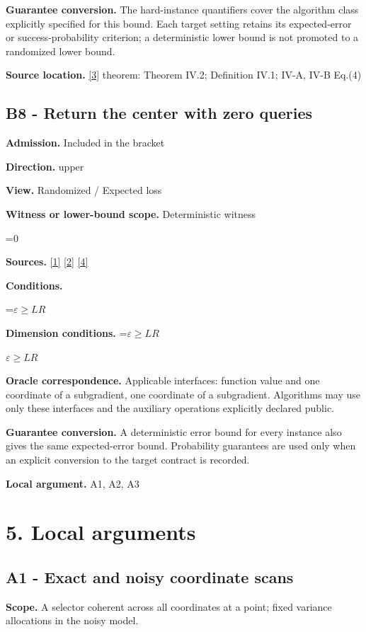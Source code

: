 \documentclass[10pt,a4paper]{article}
\newcommand{\AtlasMath}[1]{\par\begingroup\centering\setbox0=\hbox{$\displaystyle #1$}\ifdim\wd0>1.4\linewidth\typeout{ATLAS WIDE FORMULA: \the\wd0}\fi\ifdim\wd0>\linewidth\resizebox{\linewidth}{!}{\box0}\else\box0\fi\par\endgroup}
\newcommand{\AtlasInlineMath}[1]{\begingroup\setbox0=\hbox{$#1$}\ifdim\wd0>.4\linewidth\endgroup\AtlasMath{#1}\else\endgroup$#1$\fi}
\begin{document}
\textbf{Guarantee conversion.} The hard-instance quantifiers cover the algorithm class explicitly specified for this bound. Each target setting retains its expected-error or success-probability criterion; a deterministic lower bound is not promoted to a randomized lower bound.

\textbf{Source location.} \href{https://arxiv.org/pdf/1407.5144}{[3]} theorem: Theorem IV.2; Definition IV.1; IV-A, IV-B Eq.(4)

\subsection{B8 - Return the center with zero queries}
\textbf{Admission.} Included in the bracket

\textbf{Direction.} upper

\textbf{View.} Randomized / Expected loss

\textbf{Witness or lower-bound scope.} Deterministic witness

\AtlasMath{0}
\textbf{Sources.} \href{https://arxiv.org/pdf/1405.4980}{[1]} \href{https://www2.isye.gatech.edu/~nemirovs/MOR_AccuracyCertificates.pdf}{[2]} \href{https://arxiv.org/pdf/2609.20701}{[4]}

\textbf{Conditions.} 
\AtlasMath{\varepsilon\ge LR}


\textbf{Dimension conditions.} \AtlasInlineMath{\varepsilon\ge LR}

\textbf{Oracle correspondence.} Applicable interfaces: function value and one coordinate of a subgradient, one coordinate of a subgradient. Algorithms may use only these interfaces and the auxiliary operations explicitly declared public.

\textbf{Guarantee conversion.} A deterministic error bound for every instance also gives the same expected-error bound. Probability guarantees are used only when an explicit conversion to the target contract is recorded.

\textbf{Local argument.} A1, A2, A3

\section{5. Local arguments}
\subsection{A1 - Exact and noisy coordinate scans}
\textbf{Scope.} A selector coherent across all coordinates at a point; fixed variance allocations in the noisy model.
\end{document}
